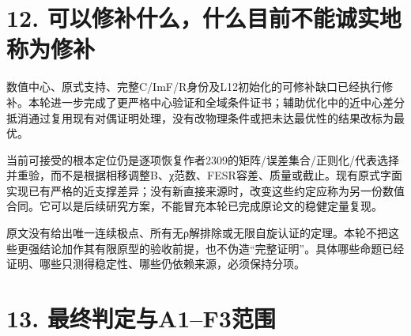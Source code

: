 \documentclass[
  10pt,
  a4paper,
]{article}
\begin{document}
\section{12.
可以修补什么，什么目前不能诚实地称为修补}\label{ux53efux4ee5ux4feeux8865ux4ec0ux4e48ux4ec0ux4e48ux76eeux524dux4e0dux80fdux8bdaux5b9eux5730ux79f0ux4e3aux4feeux8865}

数值中心、原式支持、完整C/ImF/R身份及L12初始化的可修补缺口已经执行修补。本轮进一步完成了更严格中心验证和全域条件证书；辅助优化中的近中心差分抵消通过复用现有对偶证明处理，没有改物理条件或把未达最优性的结果改标为最优。

当前可接受的根本定位仍是逐项恢复作者2309的矩阵/误差集合/正则化/代表选择并重验，而不是根据相移调整B、χ范数、FESR容差、质量或截止。现有原式字面实现已有严格的近支撑差异；没有新直接来源时，改变这些约定应称为另一份数值合同。它可以是后续研究方案，不能冒充本轮已完成原论文的稳健定量复现。

原文没有给出唯一连续极点、所有无ρ解排除或无限自旋认证的定理。本轮不把这些更强结论加作其有限原型的验收前提，也不伪造``完整证明''。具体哪些命题已经证明、哪些只测得稳定性、哪些仍依赖来源，必须保持分项。

\section{13.
最终判定与A1--F3范围}\label{ux6700ux7ec8ux5224ux5b9aux4e0ea1f3ux8303ux56f4}
\end{document}

